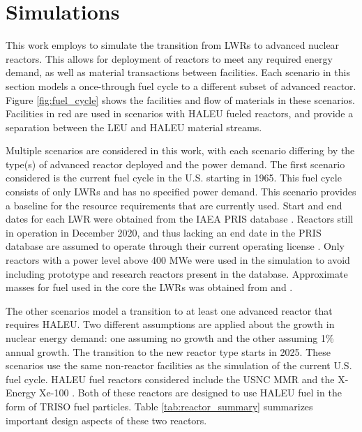 \section{Simulations}
This work employs \Cyclus \cite{huff_fundamental_2016} to simulate the transition
from \glspl{LWR} to advanced nuclear reactors. This allows for deployment of 
reactors to meet any required energy 
demand, as well as material transactions between facilities. Each scenario
in this section models a once-through fuel cycle to a different subset of 
advanced reactor. Figure \ref{fig:fuel_cycle} shows the facilities 
and flow of materials in these scenarios. Facilities in red are used in scenarios 
with \gls{HALEU} fueled reactors, and provide a separation between the 
\gls{LEU} and \gls{HALEU} material streams. 



Multiple scenarios are considered in this work, with each scenario differing
by the type(s) of advanced reactor deployed and the power demand. The first 
scenario considered 
is the current fuel cycle in the U.S. starting in 1965. This fuel cycle 
consists of only \glspl{LWR}
and has no specified power demand. This scenario provides a baseline for 
the resource requirements that are currently used. Start and 
end dates for each \gls{LWR} were obtained from the \gls{IAEA} \gls{PRIS} database 
\cite{noauthor_power_1989}. Reactors still in operation in December 2020, and thus 
lacking an end date in the \gls{PRIS} database are assumed to operate through their 
current operating license 
\cite{noauthor_initial_2021,noauthor_second_2021,noauthor_watts_2021,noauthor_watts_2021-1,noauthor_clinton_2021,noauthor_comanche_2021,noauthor_comanche_2021-1,noauthor_perry_2021}. 
Only reactors with a power level above 400 MWe were used in the simulation 
to avoid including prototype and research reactors present in the database. 
Approximate masses for fuel used in the core the \gls{LWR}s was obtained 
from \cite{todreas_nuclear_2012} and \cite{cacuci_handbook_2010}. 

The other scenarios model a transition to at least one advanced reactor 
that requires \gls{HALEU}. Two different assumptions are applied about the growth 
in nuclear energy demand: one assuming no growth and the other assuming 
1\% annual growth. The transition to the new reactor type starts in 2025. 
These scenarios use the same  
non-reactor facilities as the simulation of the current 
U.S. fuel cycle. \gls{HALEU} fuel reactors 
considered include the \gls{USNC} \gls{MMR}
\cite{mitchell_usnc_2020} and the X-Energy Xe-100 
\cite{harlan_x-energy_2018}\cite{hussain_advances_2018}. Both of 
these reactors are designed 
to use \gls{HALEU} fuel in the form of \gls{TRISO} fuel particles. Table 
\ref{tab:reactor_summary} summarizes important design aspects of these two reactors.

